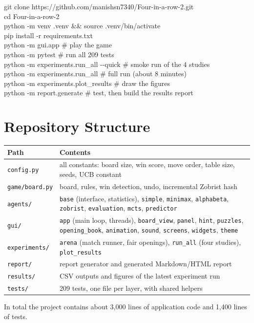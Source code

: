 \documentclass[11pt,a4paper]{article}
\newcommand{\repourl}{https://github.com/manishsn7340/Four-in-a-row-2}
\newcommand{\code}[1]{\texttt{\small #1}}
\begin{document}
\begin{tcolorbox}[enhanced,colback=lavender!40,colframe=lavmid,boxrule=0.5pt,arc=3pt,left=8pt]
\ttfamily\small
git clone \repourl.git\\
cd Four-in-a-row-2\\
python -m venv .venv \&\& source .venv/bin/activate\\
pip install -r requirements.txt\\[4pt]
python -m gui.app \hfill\color{muted}\# play the game\color{ink}\\
python -m pytest \hfill\color{muted}\# run all 209 tests\color{ink}\\
python -m experiments.run\_all -{}-quick \hfill\color{muted}\# smoke run of the 4 studies\color{ink}\\
python -m experiments.run\_all \hfill\color{muted}\# full run (about 8 minutes)\color{ink}\\
python -m experiments.plot\_results \hfill\color{muted}\# draw the figures\color{ink}\\
python -m report.generate \hfill\color{muted}\# test, then build the results report
\end{tcolorbox}

\section{Repository Structure}

\begin{center}
\small
\begin{tabularx}{\textwidth}{@{}l Y@{}}
\toprule
\textbf{Path} & \textbf{Contents} \\
\midrule
\code{config.py} & all constants: board size, win score, move order, table size, seeds, UCB constant \\
\code{game/board.py} & board, rules, win detection, undo, incremental Zobrist hash \\
\code{agents/} & \code{base} (interface, statistics), \code{simple}, \code{minimax}, \code{alphabeta}, \code{zobrist}, \code{evaluation}, \code{mcts}, \code{predictor} \\
\code{gui/} & \code{app} (main loop, threads), \code{board\_view}, \code{panel}, \code{hint}, \code{puzzles}, \code{opening\_book}, \code{animation}, \code{sound}, \code{screens}, \code{widgets}, \code{theme} \\
\code{experiments/} & \code{arena} (match runner, fair openings), \code{run\_all} (four studies), \code{plot\_results} \\
\code{report/} & report generator and generated Markdown/HTML report \\
\code{results/} & CSV outputs and figures of the latest experiment run \\
\code{tests/} & 209 tests, one file per layer, with shared helpers \\
\bottomrule
\end{tabularx}
\end{center}

In total the project contains about 3{,}000 lines of application code and 1{,}400 lines of tests.
\end{document}
